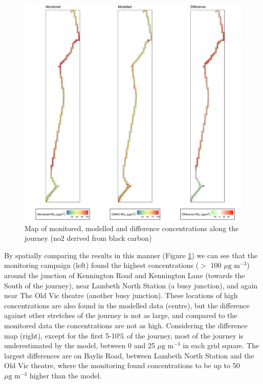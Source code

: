 \begin{figure}[H]
\centering
\includegraphics[scale=0.5]{images/monitored_modelled_summary.png}
\caption{Map of monitored, modelled and difference concentrations along the journey (\gls{no2} derived from black carbon)}
\label{fig:monitored_modelled_summary}
\end{figure}

By spatially comparing the results in this manner (Figure \ref{fig:monitored_modelled_summary}) we can see that the monitoring campaign (left) found the highest concentrations ($>$ 100 $\mu \text{g m}^{-3}$) around the junction of Kennington Road and Kennington Lane (towards the South of the journey), near Lambeth North Station (a busy junction), and again near The Old Vic theatre (another busy junction). These locations of high concentrations are also found in the modelled data (centre), but the difference against other stretches of the journey is not as large, and compared to the monitored data the concentrations are not as high. Considering the difference map (right), except for the first 5-10\% of the journey, most of the journey is underestimated by the model, between 0 and 25 $\mu \text{g m}^{-3}$ in each grid square. The largest differences are on Baylis Road, between Lambeth North Station and the Old Vic theatre, where the monitoring found concentrations to be up to 50 $\mu \text{g m}^{-3}$ higher than the model.

